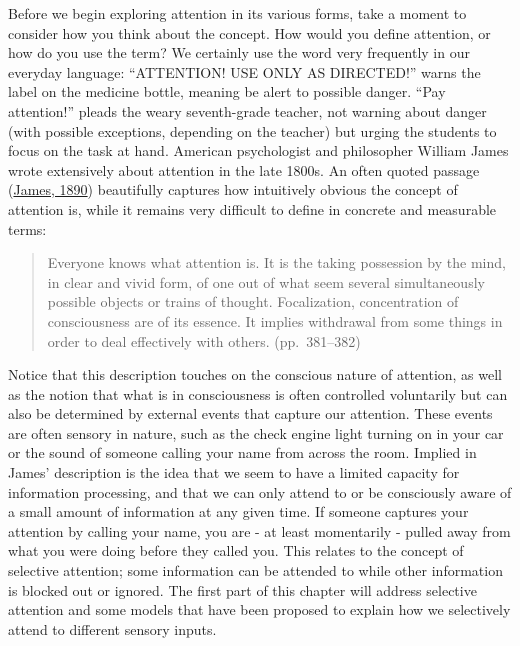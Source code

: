 \documentclass[
]{krantz}
\begin{document}
Before we begin exploring attention in its various forms, take a moment to consider how you think about the concept. How would you define attention, or how do you use the term? We certainly use the word very frequently in our everyday language: ``ATTENTION! USE ONLY AS DIRECTED!'' warns the label on the medicine bottle, meaning be alert to possible danger. ``Pay attention!'' pleads the weary seventh-grade teacher, not warning about danger (with possible exceptions, depending on the teacher) but urging the students to focus on the task at hand. American psychologist and philosopher William James wrote extensively about attention in the late 1800s. An often quoted passage (\protect\hyperlink{ref-james1890principles}{James, 1890}) beautifully captures how intuitively obvious the concept of attention is, while it remains very difficult to define in concrete and measurable terms:

\begin{quote}
Everyone knows what attention is. It is the taking possession by the mind, in clear and vivid form, of one out of what seem several simultaneously possible objects or trains of thought. Focalization, concentration of consciousness are of its essence. It implies withdrawal from some things in order to deal effectively with others. (pp.~381--382)
\end{quote}

Notice that this description touches on the conscious nature of attention, as well as the notion that what is in consciousness is often controlled voluntarily but can also be determined by external events that capture our attention. These events are often sensory in nature, such as the check engine light turning on in your car or the sound of someone calling your name from across the room. Implied in James' description is the idea that we seem to have a limited capacity for information processing, and that we can only attend to or be consciously aware of a small amount of information at any given time. If someone captures your attention by calling your name, you are - at least momentarily - pulled away from what you were doing before they called you. This relates to the concept of selective attention; some information can be attended to while other information is blocked out or ignored. The first part of this chapter will address selective attention and some models that have been proposed to explain how we selectively attend to different sensory inputs.
\end{document}

